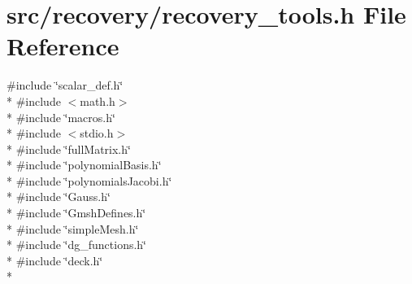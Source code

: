 \section{src/recovery/recovery\-\_\-tools.h File Reference}
\label{recovery__tools_8h}
{\ttfamily \#include \char`\"{}scalar\-\_\-def.\-h\char`\"{}}\\*
{\ttfamily \#include $<$math.\-h$>$}\\*
{\ttfamily \#include \char`\"{}macros.\-h\char`\"{}}\\*
{\ttfamily \#include $<$stdio.\-h$>$}\\*
{\ttfamily \#include \char`\"{}full\-Matrix.\-h\char`\"{}}\\*
{\ttfamily \#include \char`\"{}polynomial\-Basis.\-h\char`\"{}}\\*
{\ttfamily \#include \char`\"{}polynomials\-Jacobi.\-h\char`\"{}}\\*
{\ttfamily \#include \char`\"{}Gauss.\-h\char`\"{}}\\*
{\ttfamily \#include \char`\"{}Gmsh\-Defines.\-h\char`\"{}}\\*
{\ttfamily \#include \char`\"{}simple\-Mesh.\-h\char`\"{}}\\*
{\ttfamily \#include \char`\"{}dg\-\_\-functions.\-h\char`\"{}}\\*
{\ttfamily \#include \char`\"{}deck.\-h\char`\"{}}\\*
